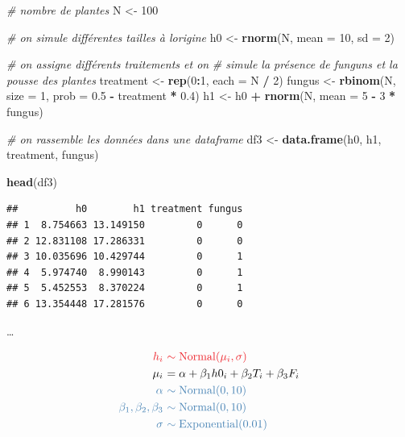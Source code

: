 \documentclass[
  a4paper,11pt,twoside,onecolumn,openright,final,oldfontcommands]{memoir}
\newenvironment{Shaded}{\begin{snugshade}}{\end{snugshade}}
\newcommand{\CommentTok}[1]{\textcolor[rgb]{0.56,0.35,0.01}{\textit{#1}}}
\newcommand{\DataTypeTok}[1]{\textcolor[rgb]{0.13,0.29,0.53}{#1}}
\newcommand{\DecValTok}[1]{\textcolor[rgb]{0.00,0.00,0.81}{#1}}
\newcommand{\FloatTok}[1]{\textcolor[rgb]{0.00,0.00,0.81}{#1}}
\newcommand{\KeywordTok}[1]{\textcolor[rgb]{0.13,0.29,0.53}{\textbf{#1}}}
\newcommand{\NormalTok}[1]{#1}
\newcommand{\OperatorTok}[1]{\textcolor[rgb]{0.81,0.36,0.00}{\textbf{#1}}}
\newcommand{\StringTok}[1]{\textcolor[rgb]{0.31,0.60,0.02}{#1}}
\theoremstyle{definition}
\theoremstyle{definition}
\theoremstyle{definition}
\theoremstyle{remark}
\begin{document}
\begin{Shaded}
\begin{Highlighting}[]
\CommentTok{\# nombre de plantes}
\NormalTok{N \textless{}{-}}\StringTok{ }\DecValTok{100}

\CommentTok{\# on simule différentes tailles à l\textquotesingle{}origine}
\NormalTok{h0 \textless{}{-}}\StringTok{ }\KeywordTok{rnorm}\NormalTok{(N, }\DataTypeTok{mean =} \DecValTok{10}\NormalTok{, }\DataTypeTok{sd =} \DecValTok{2}\NormalTok{)}

\CommentTok{\# on assigne différents traitements et on}
\CommentTok{\# simule la présence de funguns et la pousse des plantes}
\NormalTok{treatment \textless{}{-}}\StringTok{ }\KeywordTok{rep}\NormalTok{(}\DecValTok{0}\OperatorTok{:}\DecValTok{1}\NormalTok{, }\DataTypeTok{each =}\NormalTok{ N }\OperatorTok{/}\StringTok{ }\DecValTok{2}\NormalTok{)}
\NormalTok{fungus \textless{}{-}}\StringTok{ }\KeywordTok{rbinom}\NormalTok{(N, }\DataTypeTok{size =} \DecValTok{1}\NormalTok{, }\DataTypeTok{prob =} \FloatTok{0.5} \OperatorTok{{-}}\StringTok{ }\NormalTok{treatment }\OperatorTok{*}\StringTok{ }\FloatTok{0.4}\NormalTok{)}
\NormalTok{h1 \textless{}{-}}\StringTok{ }\NormalTok{h0 }\OperatorTok{+}\StringTok{ }\KeywordTok{rnorm}\NormalTok{(N, }\DataTypeTok{mean =} \DecValTok{5} \OperatorTok{{-}}\StringTok{ }\DecValTok{3} \OperatorTok{*}\StringTok{ }\NormalTok{fungus)}

\CommentTok{\# on rassemble les données dans une dataframe}
\NormalTok{df3 \textless{}{-}}\StringTok{ }\KeywordTok{data.frame}\NormalTok{(h0, h1, treatment, fungus)}

\KeywordTok{head}\NormalTok{(df3)}
\end{Highlighting}
\end{Shaded}

\begin{verbatim}
##          h0        h1 treatment fungus
## 1  8.754663 13.149150         0      0
## 2 12.831108 17.286331         0      0
## 3 10.035696 10.429744         0      1
## 4  5.974740  8.990143         0      1
## 5  5.452553  8.370224         0      1
## 6 13.354448 17.281576         0      0
\end{verbatim}

\ldots{}

\[
\begin{aligned}
\color{orangered}{h_{i}} \ &\color{orangered}{\sim \mathrm{Normal}(\mu_{i}, \sigma)} \\
\color{black}{\mu_{i}} \ &\color{black}{= \alpha + \beta_{1} h0_{i} + \beta_{2} T_{i} + \beta_{3} F_{i}} \\
\color{steelblue}{\alpha} \ &\color{steelblue}{\sim \mathrm{Normal}(0, 10)} \\
\color{steelblue}{\beta_{1}, \beta_{2}, \beta_{3}} \ &\color{steelblue}{\sim \mathrm{Normal}(0, 10)} \\
\color{steelblue}{\sigma} \ &\color{steelblue}{\sim \mathrm{Exponential}(0.01)}
\end{aligned}
\]
\end{document}
